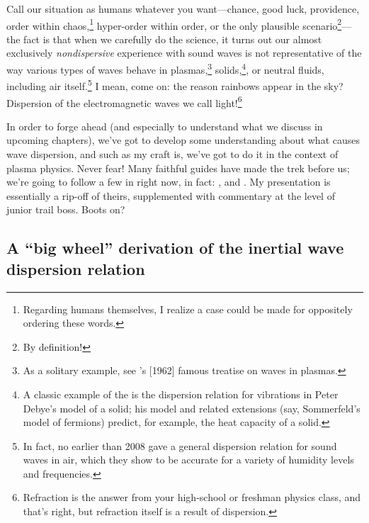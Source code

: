 Call our situation as humans whatever you want---chance, good luck, providence,
order within chaos,\footnote{Regarding humans themselves, I realize a case could
  be made for oppositely ordering these words.}  hyper-order within order, or
the only plausible scenario\footnote{By definition!}---the fact is that when we
carefully do the science, it turns out our almost exclusively
\emph{nondispersive} experience with sound waves is not representative of the
way various types of waves behave in plasmas,\footnote{As a solitary example,
  see \citeauthor{Stix1962}'s [1962] famous treatise on waves in plasmas.}
solids,\footnote{A classic example of the is the dispersion relation for
  vibrations in Peter Debye's model of a solid; his model and related extensions
  (say, Sommerfeld's model of fermions) predict, for example, the heat capacity
  of a solid.}, or neutral fluids, including air itself.\footnote{In fact, no
  earlier than 2008 \citeauthor{Alvarez2008} gave a general dispersion relation
  for sound waves in air, which they show to be accurate for a variety of
  humidity levels and frequencies.}  I mean, come on: the reason rainbows appear
in the sky? Dispersion of the electromagnetic waves we call
light!\footnote{Refraction is the answer from your high-school or freshman
  physics class, and that's right, but refraction itself is a result of
  dispersion.}

In order to forge ahead (and especially to understand what we discuss in
upcoming chapters), we've got to develop some understanding about what causes
wave dispersion, and such as my craft is, we've got to do it in the context of
plasma physics. Never fear! Many faithful guides have made the trek before us;
we're going to follow a few in right now, in fact: \citet{Goertz1979}, and
\citet{Kletzing1994}. My presentation is essentially a rip-off of theirs,
supplemented with commentary at the level of junior trail boss. Boots on?

\subsection[A ``big wheel'' derivation of the IAW dispersion
relation]{A ``big wheel'' derivation of the inertial \Alf wave dispersion
  relation} \label{ch1:ssDerivation}

